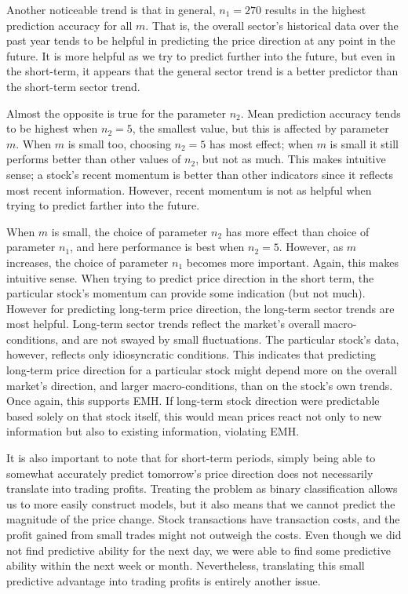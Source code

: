 \documentclass[pageno]{jpaper}
\begin{document}
Another noticeable trend is that in general, $n_1 = 270$ results in the highest prediction accuracy for all $m$. That is, the overall sector’s historical data over the past year tends to be helpful in predicting the price direction at any point in the future. It is more helpful as we try to predict further into the future, but even in the short-term, it appears that the general sector trend is a better predictor than the short-term sector trend.

Almost the opposite is true for the parameter $n_2$. Mean prediction accuracy tends to be highest when $n_2 = 5$, the smallest value, but this is affected by parameter $m$. When $m$ is small too, choosing $n_2=5$ has most effect; when $m$ is small it still performs better than other values of $n_2$, but not as much.  This makes intuitive sense; a stock’s recent momentum is better than other indicators since it reflects most recent information. However, recent momentum is not as helpful when trying to predict farther into the future.

When $m$ is small, the choice of parameter $n_2$ has more effect than choice of parameter $n_1$, and here performance is best when $n_2 = 5$. However, as $m$ increases, the choice of parameter $n_1$ becomes more important. Again, this makes intuitive sense. When trying to predict price direction in the short term, the particular stock’s momentum can provide some indication (but not much). However for predicting long-term price direction, the long-term sector trends are most helpful. Long-term sector trends reflect the market’s overall macro-conditions, and are not swayed by small fluctuations. The particular stock’s data, however, reflects only idiosyncratic conditions. This indicates that predicting long-term price direction for a particular stock might depend more on the overall market’s direction, and larger macro-conditions, than on the stock’s own trends. Once again, this supports EMH. If long-term stock direction were predictable based solely on that stock itself, this would mean prices react not only to new information but also to existing information, violating EMH.

It is also important to note that for short-term periods, simply being able to somewhat accurately predict tomorrow's price direction does not necessarily translate into trading profits. Treating the problem as binary classification allows us to more easily construct models, but it also means that we cannot predict the magnitude of the price change. Stock transactions have transaction costs, and the profit gained from small trades might not outweigh the costs.  Even though we did not find predictive ability for the next day, we were able to find some predictive ability within the next week or month. Nevertheless, translating this small predictive advantage into trading profits is entirely another issue.
\end{document}
